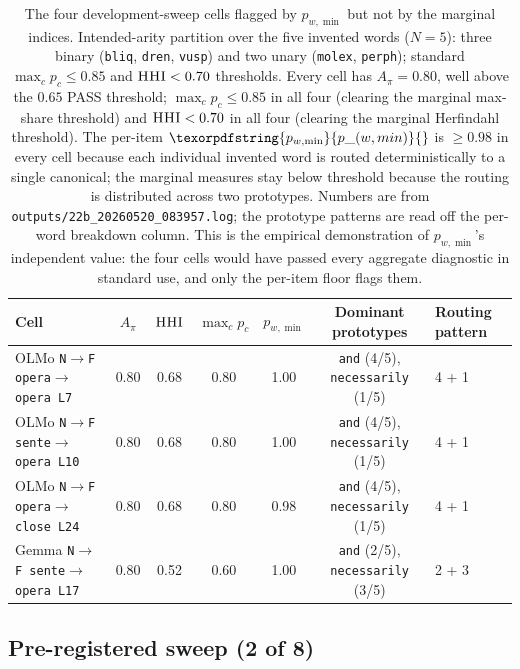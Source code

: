 \documentclass[11pt,letterpaper]{article}
\newcommand{\pwmin}{\texorpdfstring{\ensuremath{p_{w,\min}}}{p\_(w,min)}}
\newcommand{\hhi}{\textsc{HHI}}
\begin{document}
\begin{table}[h]
  \centering
  \footnotesize
  \setlength{\tabcolsep}{4pt}
  \begin{tabular}{lcccccl}
    \toprule
    Cell & $A_\pi$ & $\hhi$ & $\max_c p_c$ & \pwmin{} & Dominant prototypes & Routing pattern\\
    \midrule
    OLMo \texttt{N$\to$F opera$\to$opera L7}  & 0.80 & 0.68 & 0.80 & 1.00 & \texttt{and} (4/5), \texttt{necessarily} (1/5) & 4 + 1\\
    OLMo \texttt{N$\to$F sente$\to$opera L10} & 0.80 & 0.68 & 0.80 & 1.00 & \texttt{and} (4/5), \texttt{necessarily} (1/5) & 4 + 1\\
    OLMo \texttt{N$\to$F opera$\to$close L24} & 0.80 & 0.68 & 0.80 & 0.98 & \texttt{and} (4/5), \texttt{necessarily} (1/5) & 4 + 1\\
    Gemma \texttt{N$\to$F sente$\to$opera L17} & 0.80 & 0.52 & 0.60 & 1.00 & \texttt{and} (2/5), \texttt{necessarily} (3/5) & 2 + 3\\
    \bottomrule
  \end{tabular}
  \caption{The four development-sweep cells flagged by \pwmin{} but
  not by the marginal indices. Intended-arity partition over the
  five invented words ($N = 5$): three binary
  (\texttt{bliq}, \texttt{dren}, \texttt{vusp}) and two unary
  (\texttt{molex}, \texttt{perph}); standard
  $\max_c p_c \leq 0.85$ and $\hhi < 0.70$ thresholds. Every cell
  has $A_\pi = 0.80$, well above the $0.65$ PASS threshold;
  $\max_c p_c \leq 0.85$ in all four (clearing the marginal
  max-share threshold) and $\hhi < 0.70$ in all four (clearing the
  marginal Herfindahl threshold). The per-item $\pwmin{}$ is $\geq
  0.98$ in every cell because each individual invented word is
  routed deterministically to a single canonical; the marginal
  measures stay below threshold because the routing is distributed
  across two prototypes. Numbers are from
  \texttt{outputs/22b\_20260520\_083957.log}; the prototype
  patterns are read off the per-word breakdown column. This is the
  empirical demonstration of \pwmin's independent value: the four
  cells would have passed every aggregate diagnostic in standard
  use, and only the per-item floor flags them.}
  \label{tab:devcells}
\end{table}

\subsection{Pre-registered sweep (2 of 8)}
\label{sec:prereg}
\end{document}
